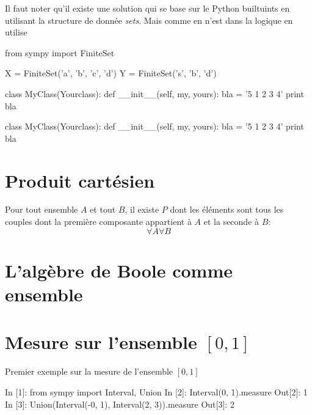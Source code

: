 \begin{solution}
Il faut noter qu'il existe une solution qui se base sur le Python builtuints en utilisant la structure de donnée \textit{sets}. Mais comme en n'est dans la logique en utilise 
\begin{python}
from sympy import FiniteSet

X = FiniteSet('a', 'b', 'c', 'd')
Y = FiniteSet('s', 'b', 'd')

class MyClass(Yourclass):
    def __init__(self, my, yours):
        bla = '5 1 2 3 4'
        print bla
\end{python}
\begin{python}
class MyClass(Yourclass):
    def __init__(self, my, yours):
        bla = '5 1 2 3 4'
        print bla
\end{python}

\end{solution}
\section{Produit cartésien}
 \begin{definition}
 Pour tout ensemble $A$ et tout $B$, il existe $P$ dont les éléments sont tous les couples dont la première composante appartient à $A$ et la seconde à $B$:
 \[
 \forall A \forall B
 \]
 
 \end{definition}
\section{L'algèbre de Boole comme ensemble}
 
 \begin{exercise}
 
 \end{exercise}
\section{Mesure sur l'ensemble $\left[0,1\right] $ }
Premier exemple sur la mesure de l'ensemble  $\left[0,1\right]$
\begin{python}
In [1]: from sympy import Interval, Union
In [2]: Interval(0, 1).measure
Out[2]: 1
In [3]: Union(Interval(-0, 1), Interval(2, 3)).measure                          
Out[3]: 2
\end{python}